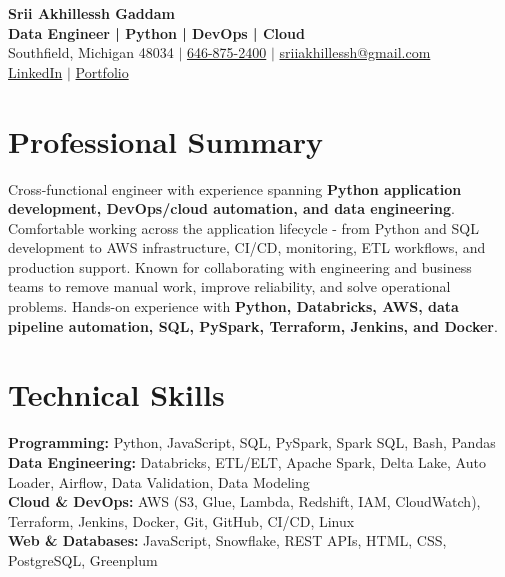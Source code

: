 \documentclass[letterpaper,10pt]{article}
\begin{document}
\fontsize{9.35pt}{10.45pt}\selectfont

\begin{center}
    {\LARGE \textbf{Srii Akhillessh Gaddam}} \\[-1pt]
    \textbf{Data Engineer | Python | DevOps | Cloud} \\[2pt]
    Southfield, Michigan 48034 $|$
    \href{tel:6468752400}{646-875-2400} $|$
    \href{mailto:sriiakhillessh@gmail.com}{sriiakhillessh@gmail.com} \\[1pt]
    \href{https://www.linkedin.com/in/srii-akhiilessh-gaddam-b48668191/}{LinkedIn} $|$
    \href{https://sriiakhillesshg.github.io/portfolio/}{Portfolio}
\end{center}
\vspace{-8pt}

\section{Professional Summary}
\small{Cross-functional engineer with experience spanning \textbf{Python application development, DevOps/cloud automation, and data engineering}. Comfortable working across the application lifecycle - from Python and SQL development to AWS infrastructure, CI/CD, monitoring, ETL workflows, and production support. Known for collaborating with engineering and business teams to remove manual work, improve reliability, and solve operational problems. Hands-on experience with \textbf{Python, Databricks, AWS, data pipeline automation, SQL, PySpark, Terraform, Jenkins, and Docker}.}

\section{Technical Skills}
\small{
\textbf{Programming:} Python, JavaScript, SQL, PySpark, Spark SQL, Bash, Pandas \\
\textbf{Data Engineering:} Databricks, ETL/ELT, Apache Spark, Delta Lake, Auto Loader, Airflow, Data Validation, Data Modeling \\
\textbf{Cloud \& DevOps:} AWS (S3, Glue, Lambda, Redshift, IAM, CloudWatch), Terraform, Jenkins, Docker, Git, GitHub, CI/CD, Linux \\
\textbf{Web \& Databases:} JavaScript, Snowflake, REST APIs, HTML, CSS, PostgreSQL, Greenplum
}

\end{document}
